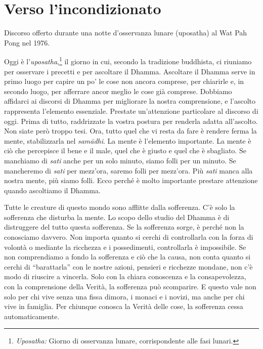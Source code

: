 \chapter{Verso l'incondizionato}

\begin{openingQuote}
  \centering

  Discorso offerto durante una notte d'osservanza lunare (uposatha) al
  Wat Pah Pong nel 1976.
\end{openingQuote}

Oggi è l'\emph{uposatha},\footnote{\emph{Uposatha:} Giorno di osservanza
  lunare, corrispondente alle fasi lunari.} il giorno in cui, secondo la
tradizione buddhista, ci riuniamo per osservare i precetti e per
ascoltare il Dhamma. Ascoltare il Dhamma serve in primo luogo per capire
un po' le cose non ancora comprese, per chiarirle e, in secondo luogo,
per afferrare ancor meglio le cose già comprese. Dobbiamo affidarci ai
discorsi di Dhamma per migliorare la nostra comprensione, e l'ascolto
rappresenta l'elemento essenziale. Prestate un'attenzione particolare al
discorso di oggi. Prima di tutto, raddrizzate la vostra postura per
renderla adatta all'ascolto. Non siate però troppo tesi. Ora, tutto quel
che vi resta da fare è rendere ferma la mente, stabilizzarla nel
\emph{samādhi}. La mente è l'elemento importante. La mente è ciò che
percepisce il bene e il male, quel che è giusto e quel che è sbagliato.
Se manchiamo di \emph{sati} anche per un solo minuto, siamo folli per un
minuto. Se mancheremo di \emph{sati} per mezz'ora, saremo folli per
mezz'ora. Più \emph{sati} manca alla nostra mente, più siamo folli. Ecco
perché è molto importante prestare attenzione quando ascoltiamo il
Dhamma.

Tutte le creature di questo mondo sono afflitte dalla sofferenza. C'è
solo la sofferenza che disturba la mente. Lo scopo dello studio del
Dhamma è di distruggere del tutto questa sofferenza. Se la sofferenza
sorge, è perché non la conosciamo davvero. Non importa quanto si cerchi
di controllarla con la forza di volontà o mediante la ricchezza e i
possedimenti, controllarla è impossibile. Se non comprendiamo a fondo la
sofferenza e ciò che la causa, non conta quanto si cerchi di
``barattarla'' con le nostre azioni, pensieri e ricchezze mondane, non
c'è modo di riuscire a vincerla. Solo con la chiara conoscenza e la
consapevolezza, con la comprensione della Verità, la sofferenza può
scomparire. E questo vale non solo per chi vive senza una fissa dimora,
i monaci e i novizi, ma anche per chi vive in famiglia. Per chiunque
conosca la Verità delle cose, la sofferenza cessa automaticamente.

